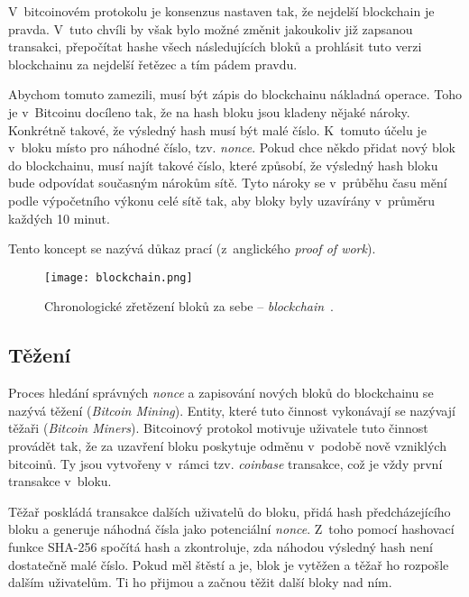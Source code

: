 V~bitcoinovém protokolu je konsenzus nastaven tak, že nejdelší blockchain je pravda. V~tuto chvíli by však bylo možné změnit jakoukoliv již zapsanou transakci, přepočítat hashe všech následujících bloků a prohlásit tuto verzi blockchainu za nejdelší řetězec a tím pádem pravdu.

Abychom tomuto zamezili, musí být zápis do blockchainu nákladná operace. Toho je v~Bitcoinu docíleno tak, že na hash bloku jsou kladeny nějaké nároky. Konkrétně takové, že výsledný hash musí být malé číslo. K~tomuto účelu je v~bloku místo pro náhodné číslo, tzv. \textit{nonce}. Pokud chce někdo přidat nový blok do blockchainu, musí najít takové číslo, které způsobí, že výsledný hash bloku bude odpovídat současným nárokům sítě. Tyto nároky se v~průběhu času mění podle výpočetního výkonu celé sítě tak, aby bloky byly uzavírány v~průměru každých 10 minut.

Tento koncept se nazývá důkaz prací (z~anglického \textit{proof of work}).

\begin{figure}[ht]
    \centering
    \texttt{[image: blockchain.png]}
    \caption{Chronologické zřetězení bloků za sebe -- \textit{blockchain}~\cite{bib_white_paper}.}
    \label{fig_blockchain}
\end{figure}


\subsection{Těžení}
\label{sec_bitcoin_tezeni}

Proces hledání správných \textit{nonce} a zapisování nových bloků do blockchainu se nazývá těžení (\textit{Bitcoin Mining}). Entity, které tuto činnost vykonávají se nazývají těžaři (\textit{Bitcoin Miners}). Bitcoinový protokol motivuje uživatele tuto činnost provádět tak, že za uzavření bloku poskytuje odměnu v~podobě nově vzniklých bitcoinů. Ty jsou vytvořeny v~rámci tzv. \textit{coinbase} transakce, což je vždy první transakce v~bloku.

Těžař poskládá transakce dalších uživatelů do bloku, přidá hash předcházejícího bloku a generuje náhodná čísla jako potenciální \textit{nonce}. Z~toho pomocí hashovací funkce SHA-256 spočítá hash a zkontroluje, zda náhodou výsledný hash není dostatečně malé číslo. Pokud měl štěstí a je, blok je vytěžen a těžař ho rozpošle dalším uživatelům. Ti ho přijmou a začnou těžit další bloky nad ním.

